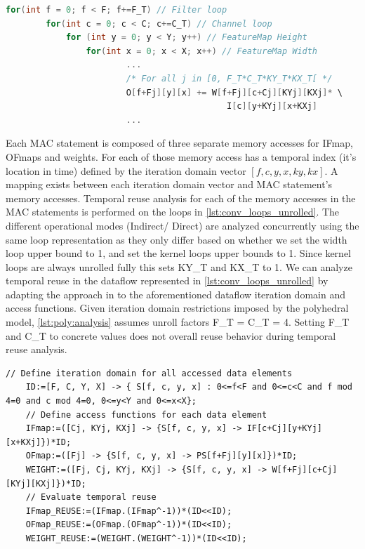 \clearpage 

\begin{lstlisting}[language=C, caption=Fully unrolled convolution dataflow loops, label={lst:conv_loops_unrolled}]
    for(int f = 0; f < F; f+=F_T) // Filter loop
        for(int c = 0; c < C; c+=C_T) // Channel loop
            for (int y = 0; y < Y; y++) // FeatureMap Height
                for(int x = 0; x < X; x++) // FeatureMap Width
                        ...
                        /* For all j in [0, F_T*C_T*KY_T*KX_T[ */ 
                        O[f+Fj][y][x] += W[f+Fj][c+Cj][KYj][KXj]* \
                                            I[c][y+KYj][x+KXj] 
                        ...
\end{lstlisting}

Each MAC statement is composed of three separate memory accesses for IFmap,
OFmaps and weights. For each of those memory access has a temporal index (it's location in time) defined by the
iteration domain vector $[f, c, y, x, ky, kx]$. A mapping exists between each
iteration domain vector and MAC statement's memory accesses.  
Temporal reuse analysis for each of the memory accesses in the MAC statements is performed on the loops in \autoref{lst:conv_loops_unrolled}. The different
operational modes (Indirect/ Direct) are analyzed concurrently using the same loop
representation as they only differ based on whether we set the width loop
upper bound to 1, and set the kernel loops upper bounds to 1. Since
kernel loops are always unrolled fully this sets KY\_T and KX\_T to 1. We can
analyze temporal reuse in the dataflow represented in
\autoref{lst:conv_loops_unrolled} by adapting the approach in \cite{meeus} 
to the aforementioned dataflow iteration domain and access functions.
Given iteration domain restrictions imposed by the polyhedral model,
\autoref{lst:poly:analysis} assumes unroll factors F\_T =
C\_T = 4. Setting F\_T and C\_T to concrete values does not overall reuse behavior during temporal reuse analysis.

\clearpage
\begin{lstlisting}[caption=Polyhedral analysis of reuse in iscc for convolution loops, label={lst:poly:analysis}]
    // Define iteration domain for all accessed data elements
    ID:=[F, C, Y, X] -> { S[f, c, y, x] : 0<=f<F and 0<=c<C and f mod 4=0 and c mod 4=0, 0<=y<Y and 0<=x<X};
    // Define access functions for each data element
    IFmap:=([Cj, KYj, KXj] -> {S[f, c, y, x] -> IF[c+Cj][y+KYj][x+KXj]})*ID;
    OFmap:=([Fj] -> {S[f, c, y, x] -> PS[f+Fj][y][x]})*ID;
    WEIGHT:=([Fj, Cj, KYj, KXj] -> {S[f, c, y, x] -> W[f+Fj][c+Cj][KYj][KXj]})*ID;
    // Evaluate temporal reuse
    IFmap_REUSE:=(IFmap.(IFmap^-1))*(ID<<ID);
    OFmap_REUSE:=(OFmap.(OFmap^-1))*(ID<<ID);
    WEIGHT_REUSE:=(WEIGHT.(WEIGHT^-1))*(ID<<ID);  

\end{lstlisting}

